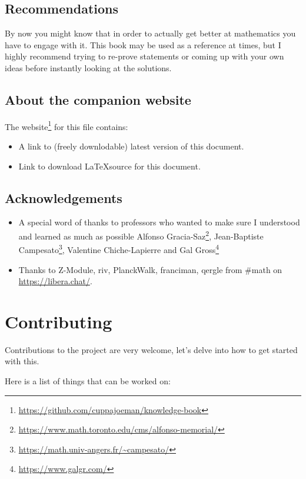 \section*{Recommendations}
By now you might know that in order to actually get better at mathematics you have to engage with it. This book may be used as a reference at times, but I highly recommend trying to re-prove statements or coming up with your own ideas before instantly looking at the solutions.

\section*{About the companion website}
The website\footnote{\url{https://github.com/cuppajoeman/knowledge-book}} for this file contains:
\begin{itemize}
  \item A link to (freely downlodable) latest version of this document.
  \item Link to download \LaTeX source for this document.
\end{itemize}

\section*{Acknowledgements}
\begin{itemize}
    \item A special word of thanks to professors who wanted to make sure I understood and learned as much as possible Alfonso Gracia-Saz\footnote{\url{https://www.math.toronto.edu/cms/alfonso-memorial/}}, Jean-Baptiste Campesato\footnote{\url{https://math.univ-angers.fr/~campesato/}}, Valentine Chiche-Lapierre and Gal Gross\footnote{\url{https://www.galgr.com/}}
    \item Thanks to Z-Module, riv, PlanckWalk, franciman, qergle from \#math on \url{https://libera.chat/}.
\end{itemize}

\chapter*{Contributing}
 
Contributions to the project are very welcome, let's delve into how to get started with this.

Here is a list of things that can be worked on:

